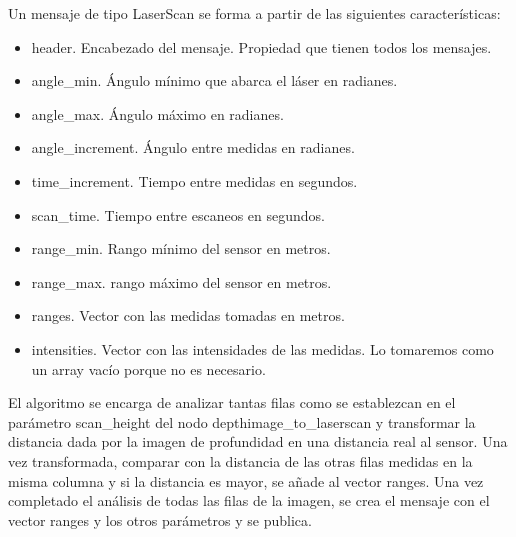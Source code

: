 Un mensaje de tipo LaserScan se forma a partir de las siguientes características:

\begin{itemize}

	\item header. Encabezado del mensaje. Propiedad que tienen todos los mensajes.
	\item angle\_min. Ángulo mínimo que abarca el láser en radianes.
	\item angle\_max. Ángulo máximo en radianes.
	\item angle\_increment. Ángulo entre medidas en radianes.
	\item time\_increment. Tiempo entre medidas en segundos.
	\item scan\_time. Tiempo entre escaneos en segundos.
	\item range\_min. Rango mínimo del sensor en metros.
	\item range\_max. rango máximo del sensor en metros.
	\item ranges. Vector con las medidas tomadas en metros.
	\item intensities. Vector con las intensidades de las medidas. Lo tomaremos como un array vacío porque no es necesario.

\end{itemize}

El algoritmo se encarga de analizar tantas filas como se establezcan en el parámetro scan\_height del nodo depthimage\_to\_laserscan y transformar la distancia dada por la imagen de profundidad en una distancia real al sensor. Una vez transformada, comparar con la distancia de las otras filas medidas en la misma columna y si la distancia es mayor, se añade al vector ranges. Una vez completado el análisis de todas las filas de la imagen, se crea el mensaje con el vector ranges y los otros parámetros y se publica.\\




